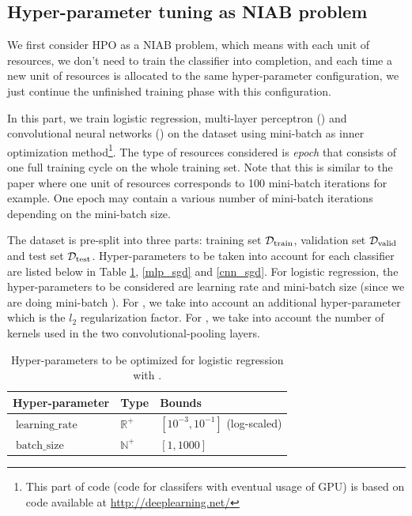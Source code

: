 \documentclass[twoside,11pt]{article}
\begin{document}
\subsection{Hyper-parameter tuning as NIAB problem}

We first consider HPO as a NIAB problem, which means with each unit of resources, we don't need to train the classifier into completion, and each time a new unit of resources is allocated to the same hyper-parameter configuration, we just continue the unfinished training phase with this configuration. 

In this part, we train logistic regression, multi-layer perceptron (\MLP) and convolutional neural networks (\CNN) on the \MNIST dataset using mini-batch  \SGD as inner optimization method\footnote{This part of code (code for classifers with eventual usage of GPU) is based on code available at \url{http://deeplearning.net/}}. The type of resources considered is \emph{epoch} that consists of one full training cycle on the whole training set. Note that this is similar to the \Hyperband paper where one unit of resources corresponds to 100 mini-batch iterations for example. One epoch may contain a various number of mini-batch iterations depending on the mini-batch size.

The dataset is pre-split into three parts: training set $\mathcal{D}_{\operatorname{train}}$, validation set $\mathcal{D}_{\operatorname{valid}}$ and test set $\mathcal{D}_{\operatorname{test}}$. Hyper-parameters to be taken into account for each classifier are listed below in Table \ref{logistic_sgd}, \ref{mlp_sgd} and \ref{cnn_sgd}. For logistic regression, the hyper-parameters to be considered are learning rate and mini-batch size (since we are doing mini-batch \SGD). For \MLP, we take into account an additional hyper-parameter which is the $l_2$ regularization factor. For \CNN, we take into account the number of kernels used in the two convolutional-pooling layers.

\begin{table}[ht]
\centering
\begin{tabular}{@{}lll@{}}
\toprule
\textbf{Hyper-parameter} & \textbf{Type}                      & \textbf{Bounds}               \\ \midrule
$\operatorname{learning\_rate}$                & $\mathbb{R}^+$ & $\left[ 10^{-3}, 10^{-1} \right]$ (log-scaled) \\
$\operatorname{batch\_size}$           & $\mathbb{N}^+$ & $\left[1, 1000 \right]$         \\ \bottomrule
\end{tabular}
\caption{Hyper-parameters to be optimized for logistic regression with \SGD.}
\label{logistic_sgd}
\end{table}
\end{document}
